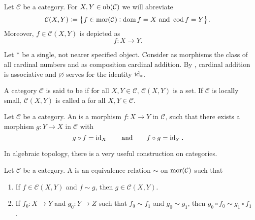 \begin{remark}
	Let $\mathcal{C}$ be a category. For $X,Y \in \operatorname{ob}(\mathcal{C})$ we will abreviate
	\begin{equation*}
		\mathcal{C}(X,Y) := \cbr{f \in \mor(\mathcal{C}) : \dom f = X \text{ and } \cod f = Y}.
	\end{equation*}
	Moreover, $f \in \mathcal{C}(X,Y)$ is depicted as
	\begin{equation}
		f : X \to Y.
	\end{equation}
\end{remark}

\begin{example}
	Let $\ast$ be a single, not nearer specified object. Consider as morphisms the class of all cardinal numbers and as composition cardinal addition. By \cite[112--113]{halbeisen:set_theory:2012}, cardinal addition is associative and $\varnothing$ serves for the identity $\operatorname{id}_\ast$.  
\end{example}

\begin{definition}
	A category $\mathcal{C}$ is said to be  if for all $X,Y \in \mathcal{C}$, $\mathcal{C}(X,Y)$ is a set. If $\mathcal{C}$ is locally small, $\mathcal{C}(X,Y)$ is called a  for all $X,Y \in \mathcal{C}$. 
\end{definition}

\begin{definition}[Isomorphism]
	Let $\mathcal{C}$ be a category. An  is a morphism $f : X \to Y$ in $\mathcal{C}$, such that there exists a morphism $g : Y \to X$ in $\mathcal{C}$ with 
	\begin{equation*}
		g \circ f = \operatorname{id}_X \qquad \text{and} \qquad f \circ g = \operatorname{id}_Y.
	\end{equation*}
\end{definition}

In algebraic topology, there is a very useful construction on categories.

\begin{definition}[Congruence]
	Let $\mathcal{C}$ be a category. A  is an equivalence relation $\sim$ on $\operatorname{mor}(\mathcal{C})$ such that 
	\begin{enumerate}[label = \textup{(}\alph*\textup{)},wide = 0pt]
		\item If $f \in \mathcal{C}(X,Y)$ and $f {\sim} g$, then $g \in \mathcal{C}(X,Y)$.
		\item If $f_0 : X \to Y$ and $g_0 : Y \to Z$ such that $f_0 {\sim} f_1$ and $g_0 {\sim} g_1$, then $g_0 \circ f_0 {\sim} g_1 \circ f_1$.
	\end{enumerate}
\end{definition}

